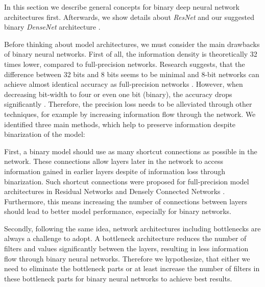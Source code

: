 \documentclass[10pt,twocolumn,letterpaper]{article}
\newcommand{\architecture}[1]{\emph{#1}}
\begin{document}
In this section we describe general concepts for binary deep neural network architectures first.
Afterwards, we show details about \architecture{ResNet}\cite{He2017} and our suggested binary \architecture{DenseNet} architecture \cite{Huang2016}.

Before thinking about model architectures, we must consider the main drawbacks of binary neural networks.
First of all, the information density is theoretically 32 times lower, compared to full-precision networks.
Research suggests, that the difference between 32 bits and 8 bits seems to be minimal and 8-bit networks can achieve almost identical accuracy as full-precision networks \cite{Han2015}.
However, when decreasing bit-width to four or even one bit (binary), the accuracy drops significantly \cite{Courbariaux2016,Zhou2016}.
Therefore, the precision loss needs to be alleviated through other techniques, for example by increasing information flow through the network.
We identified three main methods, which help to preserve information despite binarization of the model:

First, a binary model should use as many shortcut connections as possible in the network.
These connections allow layers later in the network to access information gained in earlier layers despite of information loss through binarization.
Such shortcut connections were proposed for full-precision model architectures in Residual Networks \cite{He2017} and Densely Connected Networks \cite{Huang2016}.
Furthermore, this means increasing the number of connections between layers should lead to better model performance, especially for binary networks.

Secondly, following the same idea, network architectures including bottlenecks are always a challenge to adopt.
A bottleneck architecture reduces the number of filters and values significantly between the layers, resulting in less information flow through binary neural networks.
Therefore we hypothesize, that either we need to eliminate the bottleneck parts or at least increase the number of filters in these bottleneck parts for binary neural networks to achieve best results.
\end{document}
